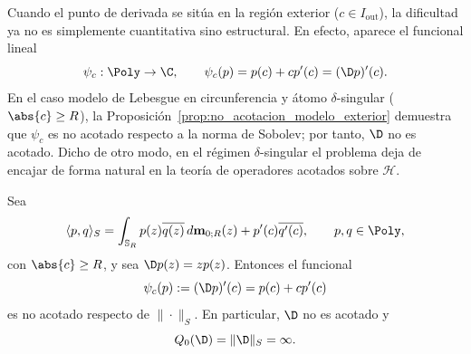 Cuando el punto de derivada se sitúa en la región exterior ($c \in I_{\mathrm{out}}$), la dificultad ya no es simplemente cuantitativa sino estructural. En efecto, aparece el funcional lineal
\[
	\psi_c:\Poly\to\C,
	\qquad
	\psi_c(p)=p(c)+c p'(c)=(\D p)'(c).
\]
En el caso modelo de Lebesgue en circunferencia y átomo $\delta$-singular ($\abs{c}\ge R$), la Proposición~\ref{prop:no_acotacion_modelo_exterior} demuestra que $\psi_c$ es no acotado respecto a la norma de Sobolev; por tanto, $\D$ no es acotado. Dicho de otro modo, en el régimen $\delta$-singular el problema deja de encajar de forma natural en la teoría de operadores acotados sobre $\mathcal{H}$.

\begin{prop}
	\label{prop:no_acotacion_modelo_exterior}
	Sea
	\[
		\langle p,q\rangle_S
		=
		\int_{\mathbb{S}_R} p(z)\overline{q(z)}\, d\mathbf m_{0;R}(z)
		+
		p'(c)\overline{q'(c)},
		\qquad p,q\in\Poly,
	\]
	con $\abs{c}\ge R$, y sea $\D p(z)=zp(z)$. Entonces el funcional
	\[
		\psi_c(p):=(\D p)'(c)=p(c)+cp'(c)
	\]
	es no acotado respecto de $\|\cdot\|_S$. En particular, $\D$ no es acotado y
	\[
		Q_0(\D)=\|\D\|_S=\infty.
	\]
\end{prop}

